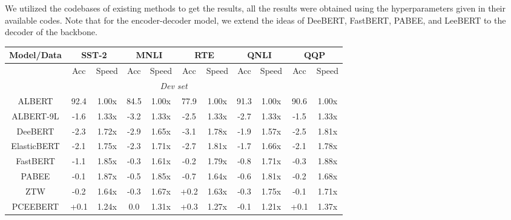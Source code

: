 We utilized the codebases of existing methods to get the results, all the results were obtained using the hyperparameters given in their available codes. Note that for the encoder-decoder model, we extend the ideas of DeeBERT, FastBERT, PABEE, and LeeBERT to the decoder of the backbone.
\begin{table*}[]
\centering
\small
\begin{tabular}{ccccccccccc}
\hline
\textbf{Model/Data}               & \multicolumn{2}{c}{\textbf{SST-2}}    & \multicolumn{2}{c}{\textbf{MNLI}}      & \multicolumn{2}{c}{\textbf{RTE}}      & \multicolumn{2}{c}{\textbf{QNLI}}     & \multicolumn{2}{c}{\textbf{QQP}}      \\ \hline
                         & Acc          & Speed      & Acc           & Speed      & Acc          & Speed      & Acc          & Speed      & Acc          & Speed      \\ \hline
\multicolumn{11}{c}{\textit{Dev set}}                                                                                                                                                         \\ \hline
ALBERT                   & 92.4         & 1.00x             & 84.5          & 1.00x             & 77.9         & 1.00x             & 91.3         & 1.00x             & 90.6         & 1.00x             \\
ALBERT-9L                & -1.6         & 1.33x          & -3.2          & 1.33x          & -2.5         & 1.33x          & -2.7         & 1.33x          & -1.5         & 1.33x          \\ \hline
DeeBERT                  & -2.3         & 1.72x          & -2.9          & 1.65x          & -3.1         & 1.78x          & -1.9         & 1.57x          & -2.5         & 1.81x          \\
ElasticBERT              & -2.1         & 1.75x          & -2.3          & 1.71x          & -2.7         & 1.81x          & -1.7         & 1.66x          & -2.1         & 1.78x          \\
FastBERT                 & -1.1         & 1.85x          & -0.3          & 1.61x          & -0.2         & 1.79x          & -0.8         & 1.71x          & -0.3         & 1.88x          \\
PABEE                    & -0.1         & 1.87x          & -0.5          & 1.85x          & -0.7         & 1.64x          & -0.6         & 1.81x          & -0.2         & 1.68x          \\
ZTW                      & -0.2         & 1.64x          & -0.3          & 1.67x          & +0.2         & 1.63x          & -0.3         & 1.75x          & -0.1         & 1.71x          \\
PCEEBERT                  & +0.1         & 1.24x          & 0.0          & 1.31x          & +0.3          & 1.27x          & -0.1         & 1.21x          & +0.1         & 1.37x          \\


\end{tabular}
\end{table*}
